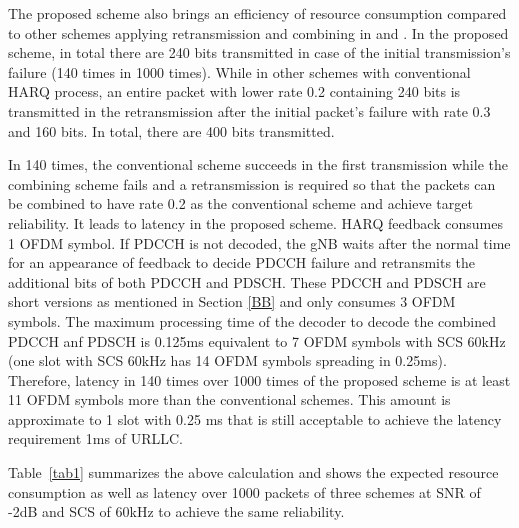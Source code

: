 \documentclass[conference,10pt]{IEEEtran}
\begin{document}
The proposed scheme also brings an efficiency of resource consumption compared to other schemes applying retransmission and combining in \cite{b3} and \cite{b4}. In the proposed scheme, in total there are 240 bits transmitted in case of the initial transmission's failure (140 times in 1000 times). While in other schemes with conventional HARQ process, an entire packet with lower rate 0.2 containing 240 bits is transmitted in the retransmission after the initial packet's failure with rate 0.3 and 160 bits. In total, there are 400 bits transmitted.

In 140 times, the conventional scheme succeeds in the first transmission while the combining scheme fails and a retransmission is required so that the packets can be combined to have rate 0.2 as the conventional scheme and achieve target reliability. It leads to latency in the proposed scheme. HARQ feedback consumes 1 OFDM symbol. If PDCCH is not decoded, the gNB waits after the normal time for an appearance of feedback to decide PDCCH failure and retransmits the additional bits of both PDCCH and PDSCH. These PDCCH and PDSCH are short versions as mentioned in Section \ref{BB} and only consumes 3 OFDM symbols. The maximum processing time of the decoder to decode the combined PDCCH anf PDSCH is 0.125ms equivalent to 7 OFDM symbols with SCS 60kHz (one slot with SCS 60kHz has 14 OFDM symbols spreading in 0.25ms). Therefore, latency in 140 times over 1000 times of the proposed scheme is at least 11 OFDM symbols more than the conventional schemes. This amount is approximate to 1 slot with 0.25 ms that is still acceptable to achieve the latency requirement 1ms of URLLC.

Table~\ref{tab1} summarizes the above calculation and shows the expected resource consumption as well as latency over 1000 packets of three schemes at SNR of -2dB and SCS of 60kHz to achieve the same reliability.
\end{document}
